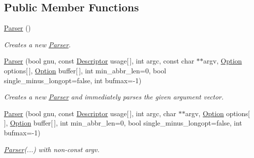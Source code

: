\subsection*{Public Member Functions}
\begin{DoxyCompactItemize}
\item 
\mbox{\label{classoption_1_1_parser_a895e9a1db19f1a026ee6a7412de17d04}} 
\hyperlink{classoption_1_1_parser_a895e9a1db19f1a026ee6a7412de17d04}{Parser} ()
\begin{DoxyCompactList}\small\item\em Creates a new \hyperlink{classoption_1_1_parser}{Parser}. \end{DoxyCompactList}\item 
\hyperlink{classoption_1_1_parser_aa747e9792c9c08ede32b6c323438db71}{Parser} (bool gnu, const \hyperlink{structoption_1_1_descriptor}{Descriptor} usage\mbox{[}$\,$\mbox{]}, int argc, const char $\ast$$\ast$argv, \hyperlink{classoption_1_1_option}{Option} options\mbox{[}$\,$\mbox{]}, \hyperlink{classoption_1_1_option}{Option} buffer\mbox{[}$\,$\mbox{]}, int min\+\_\+abbr\+\_\+len=0, bool single\+\_\+minus\+\_\+longopt=false, int bufmax=-\/1)
\begin{DoxyCompactList}\small\item\em Creates a new \hyperlink{classoption_1_1_parser}{Parser} and immediately parses the given argument vector. \end{DoxyCompactList}\item 
\mbox{\label{classoption_1_1_parser_a78b4c7d73fff17204dd908b1b167dec9}} 
\hyperlink{classoption_1_1_parser_a78b4c7d73fff17204dd908b1b167dec9}{Parser} (bool gnu, const \hyperlink{structoption_1_1_descriptor}{Descriptor} usage\mbox{[}$\,$\mbox{]}, int argc, char $\ast$$\ast$argv, \hyperlink{classoption_1_1_option}{Option} options\mbox{[}$\,$\mbox{]}, \hyperlink{classoption_1_1_option}{Option} buffer\mbox{[}$\,$\mbox{]}, int min\+\_\+abbr\+\_\+len=0, bool single\+\_\+minus\+\_\+longopt=false, int bufmax=-\/1)
\begin{DoxyCompactList}\small\item\em \hyperlink{classoption_1_1_parser}{Parser}(...) with non-\/const argv. \end{DoxyCompactList}\item 
\mbox{\label{classoption_1_1_parser_ae4100da4b662937ead22484e6cfc7cec}} 

\end{DoxyCompactItemize}
